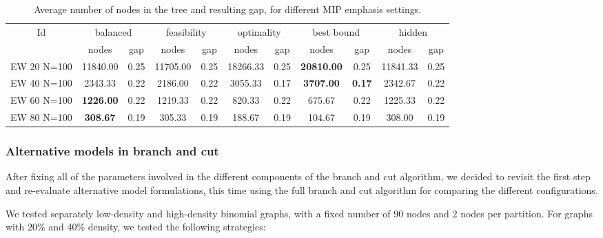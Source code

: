 \begin{sidewaystable}[h]
\centering

\begin{tabular}{|c|cc|cc|cc|cc|cc|}
\hline
\multicolumn{1}{|c|}{Id} & \multicolumn{2}{|c|}{balanced} & \multicolumn{2}{|c|}{feasibility} & \multicolumn{2}{|c|}{optimality} & \multicolumn{2}{|c|}{best bound} & \multicolumn{2}{|c|}{hidden}
\\
 & nodes & gap & nodes & gap & nodes & gap & nodes & gap & nodes & gap
\\
\hline
EW 20 N=100 & 11840.00 & 0.25 & 11705.00 & 0.25 & 18266.33 & 0.25 & \textbf{20810.00} & 0.25 & 11841.33 & 0.25
\\
EW 40 N=100 & 2343.33 & 0.22 & 2186.00 & 0.22 & 3055.33 & 0.17 & \textbf{3707.00} & \textbf{0.17} & 2342.67 & 0.22
\\
EW 60 N=100 & \textbf{1226.00} & 0.22 & 1219.33 & 0.22 & 820.33 & 0.22 & 675.67 & 0.22 & 1225.33 & 0.22
\\
EW 80 N=100 & \textbf{308.67} & 0.19 & 305.33 & 0.19 & 188.67 & 0.19 & 104.67 & 0.19 & 308.00 & 0.19
\\
\hline 
\end{tabular}

\caption{Average number of nodes in the tree and resulting gap, for different MIP emphasis settings.}
\label{table:bnc:emph}

\end{sidewaystable}

\clearpage





\subsubsection{Alternative models in branch and cut}

After fixing all of the parameters involved in the different components of the branch and cut algorithm, we decided to revisit the first step and re-evaluate alternative model formulations, this time using the full branch and cut algorithm for comparing the different configurations.

We tested separately low-density and high-density binomial graphs, with a fixed number of $90$ nodes and $2$ nodes per partition. For graphs with $20\%$ and $40\%$ density, we tested the following strategies:

\begin{itemize}
\end{itemize}

